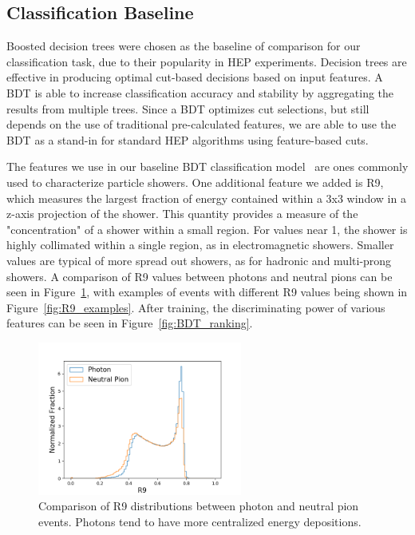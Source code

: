 \subsection*{Classification Baseline}\label{app:BDT}

Boosted decision trees were chosen as the baseline of comparison for our classification task, due to their popularity in HEP experiments. Decision trees are effective in producing optimal cut-based decisions based on input features. A BDT is able to increase classification accuracy and stability by aggregating the results from multiple trees. Since a BDT optimizes cut selections, but still depends on the use of traditional pre-calculated features, we are able to use the BDT as a stand-in for standard HEP algorithms using feature-based cuts.

The features we use in our baseline BDT classification model~\cite{NIPS} are ones commonly used to characterize particle showers. One additional feature we added is R9, which measures the largest fraction of energy contained within a 3x3 window in a z-axis projection of the shower. This quantity provides a measure of the "concentration" of a shower within a small region. For values near 1, the shower is highly collimated within a single region, as in electromagnetic showers. Smaller values are typical of more spread out showers, as for hadronic and multi-prong showers. A comparison of R9 values between photons and neutral pions can be seen in Figure~\ref{fig:R9}, with examples of events with different R9 values being shown in Figure~\ref{fig:R9_examples}. After training, the discriminating power of various features can be seen in Figure~\ref{fig:BDT_ranking}.

\begin{figure}[htbp]
\centering
\includegraphics[width=0.6\textwidth]{Images/Calo/R9_ratios.png}
\caption{Comparison of R9 distributions between photon and neutral pion events. Photons tend to have more centralized energy depositions.
\label{fig:R9}}
\end{figure}

